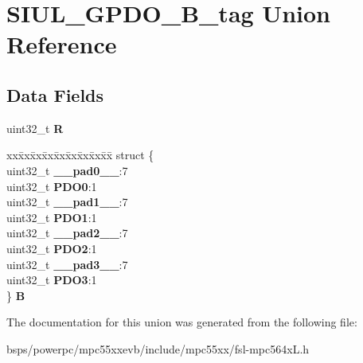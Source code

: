 \hypertarget{unionSIUL__GPDO__32B__tag}{}\section{S\+I\+U\+L\+\_\+\+G\+P\+D\+O\+\_\+B\+\_\+tag Union Reference}
\label{unionSIUL__GPDO__32B__tag}
\subsection*{Data Fields}
\begin{DoxyCompactItemize}
\item 
\mbox{\label{unionSIUL__GPDO__32B__tag_a1d0fef692565428552c2dec0e714d4b9}} 
uint32\+\_\+t {\bfseries R}
\item 
\mbox{\label{unionSIUL__GPDO__32B__tag_afae1598c08b184866f88963c9cd24f1d}} 
\begin{tabbing}
xx\=xx\=xx\=xx\=xx\=xx\=xx\=xx\=xx\=\kill
struct \{\\
\>uint32\_t {\bfseries \_\_pad0\_\_}:7\\
\>uint32\_t {\bfseries PDO0}:1\\
\>uint32\_t {\bfseries \_\_pad1\_\_}:7\\
\>uint32\_t {\bfseries PDO1}:1\\
\>uint32\_t {\bfseries \_\_pad2\_\_}:7\\
\>uint32\_t {\bfseries PDO2}:1\\
\>uint32\_t {\bfseries \_\_pad3\_\_}:7\\
\>uint32\_t {\bfseries PDO3}:1\\
\} {\bfseries B}\\

\end{tabbing}\end{DoxyCompactItemize}


The documentation for this union was generated from the following file\+:\begin{DoxyCompactItemize}
\item 
bsps/powerpc/mpc55xxevb/include/mpc55xx/fsl-\/mpc564x\+L.\+h\end{DoxyCompactItemize}
